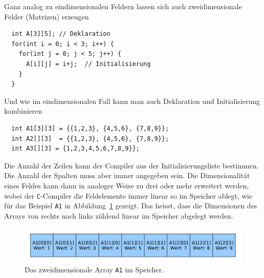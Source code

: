 Ganz analog zu eindimensionalen Feldern lassen sich auch zweidimensionale Felder (Matrizen) erzeugen
\begin{lstlisting}
  int A[3][5]; // Deklaration
  for(int i = 0; i < 3; i++) {
    for(int j = 0; j < 5; j++) {
      A[i][j] = i+j;  // Initialisierung
    }
  }
\end{lstlisting}
Und wie im eindimensionalen Fall kann man auch Deklaration und Initialisierung kombinieren
\begin{lstlisting}
  int A1[3][3] = {{1,2,3}, {4,5,6}, {7,8,9}};
  int A2[][3]  = {{1,2,3}, {4,5,6}, {7,8,9}};
  int A3[][3] = {1,2,3,4,5,6,7,8,9}};
\end{lstlisting}
Die Anzahl der Zeilen kann der Compiler aus der Initialisierungsliste bestimmen.
Die Anzahl der Spalten muss aber immer angegeben sein.
Die Dimensionalität eines Feldes kann dann in analoger Weise zu drei oder mehr erweitert werden, wobei der \texttt{C}-Compiler die Feldelemente immer linear so im Speicher ablegt, wie für das Beispiel \texttt{A1} in Abbildung~\ref{fig:2darray} gezeigt.
Das heisst, dass die Dimensionen des Arrays von rechts nach links zählend linear im Speicher abgelegt werden.

\begin{figure}[!ht]
  \includegraphics[width=\textwidth]{graphics/2darray_im_speicher}
  \caption{\label{fig:2darray} Das zweidimensionale Array \texttt{A1} im Speicher.}
\end{figure}

